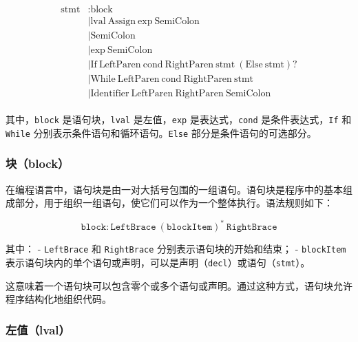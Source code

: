 \documentclass[../main.tex]{subfiles}
\begin{document}
\begin{gather*}
	\begin{aligned}
		\text{stmt} & \colon  \text{block}                                                                                             \\
		            & \mid \text{lval} \ \text{Assign} \ \text{exp} \ \text{SemiColon}                                                 \\
		            & \mid \text{SemiColon}                                                                                            \\
		            & \mid \text{exp} \ \text{SemiColon}                                                                               \\
		            & \mid \text{If} \ \text{LeftParen} \ \text{cond} \ \text{RightParen} \ \text{stmt} \ (\text{Else} \ \text{stmt})? \\
		            & \mid \text{While} \ \text{LeftParen} \ \text{cond} \ \text{RightParen} \ \text{stmt}                             \\
		            & \mid \text{Identifier} \ \text{LeftParen} \ \text{RightParen} \ \text{SemiColon}
	\end{aligned}
\end{gather*}

其中，\texttt{block} 是语句块，\texttt{lval} 是左值，\texttt{exp} 是表达式，\texttt{cond} 是条件表达式，\texttt{If} 和 \texttt{While} 分别表示条件语句和循环语句。\texttt{Else} 部分是条件语句的可选部分。

\subsubsection{块（block）}

在编程语言中，语句块是由一对大括号包围的一组语句。语句块是程序中的基本组成部分，用于组织一组语句，使它们可以作为一个整体执行。语法规则如下：

\[
\texttt{block} \colon \texttt{LeftBrace} \ (\texttt{blockItem})^* \ \texttt{RightBrace}
\]

其中：
- \texttt{LeftBrace} 和 \texttt{RightBrace} 分别表示语句块的开始和结束；
- \texttt{blockItem} 表示语句块内的单个语句或声明，可以是声明（\texttt{decl}）或语句（\texttt{stmt}）。

这意味着一个语句块可以包含零个或多个语句或声明。通过这种方式，语句块允许程序结构化地组织代码。

\subsubsection{左值（lval）}
\end{document}
